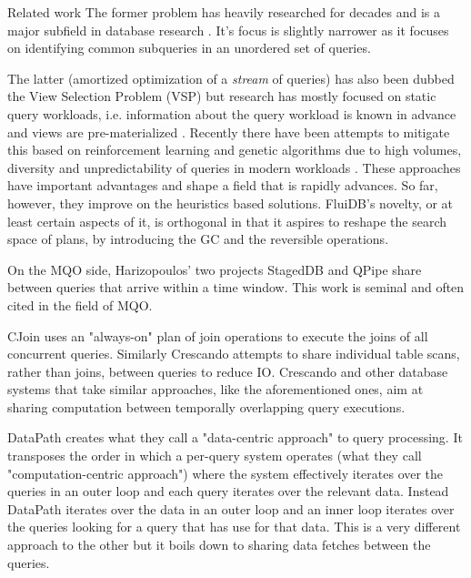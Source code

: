 \begin{corrected}{Related work}
The former problem has heavily researched for decades and is a major
 subfield in database research \cite{sellisMultipleQueryOptimization1987,royEfficientExtensibleAlgorithms2000,ComputingQueriesDerived}. It's
 focus is slightly narrower as it focuses on identifying common
 subqueries in an unordered set of queries.

The latter (amortized optimization of a \emph{stream} of queries) has also
been dubbed the View Selection Problem (VSP) but research has mostly
focused on static query workloads, i.e. information about the query
workload is known in advance and views are pre-materialized
\cite{phanDynamicMaterializationQuery2008a}. Recently there have been
attempts to mitigate this based on reinforcement learning
\cite{yuanAutomaticViewGeneration2020a} and genetic
algorithms\cite{vijaykumarMaterializedViewSelection2012,zhangGeneticAlgorithmMaterialized1999,bayirGeneticAlgorithmMultipleQuery2007}
due to high volumes, diversity and unpredictability of queries in
modern workloads \cite{liMachineLearningDatabases2021a}. These
approaches have important advantages and shape a field that is rapidly
advances. So far, however, they improve on the heuristics based
solutions. FluiDB's novelty, or at least certain aspects of it, is
orthogonal in that it aspires to reshape the search space of plans, by
introducing the GC and the reversible operations.

On the MQO side, Harizopoulos' two projects StagedDB
\cite{harizopoulosStagedDBDesigningDatabase2005} and QPipe
\cite{harizopoulosQpipeSimultaneouslyPipelined2005} share between
queries that arrive within a time window. This work is seminal and
often cited in the field of MQO.

CJoin \cite{candeaScalablePredictableJoin2009} uses an "always-on" plan
of join operations to execute the joins of all concurrent
queries. Similarly Crescando \cite{giannikisCrescando2010} attempts to
share individual table scans, rather than joins, between queries to
reduce IO. Crescando and other database systems that take similar
approaches, like the aforementioned ones, aim at sharing computation
between temporally overlapping query executions.

DataPath \cite{arumugamDataPathSystemDatacentric2010} creates what they
call a "data-centric approach" to query processing. It transposes the
order in which a per-query system operates (what they call
"computation-centric approach") where the system effectively iterates
over the queries in an outer loop and each query iterates over the
relevant data. Instead DataPath iterates over the data in an outer
loop and an inner loop iterates over the queries looking for a query
that has use for that data. This is a very different approach to the
other but it boils down to sharing data fetches between the queries.


\end{corrected}
